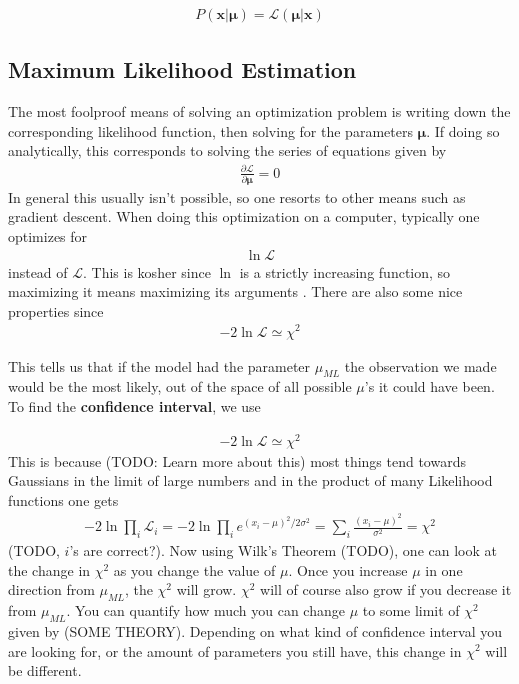 \begin{align}
	P(\textbf{x}|\boldsymbol{\mu}) = \mathcal{L}(\boldsymbol{\mu}|\textbf{x})
\end{align}

\subsection{Maximum Likelihood Estimation}
The most foolproof means of solving an optimization problem is writing down the corresponding likelihood function, then solving for the parameters $\boldsymbol{\mu}$. If doing so analytically, this corresponds to solving the series of equations given by
\begin{align}
\frac{\partial \mathcal{L}}{\partial \boldsymbol{\mu}} = 0
\end{align}
In general this usually isn't possible, so one resorts to other means such as gradient descent. When doing this optimization on a computer, typically one optimizes for
\begin{align}
	\ln\mathcal{L}
\end{align}
instead of $\mathcal{L}$. This is kosher since $\ln$ is a strictly increasing function, so maximizing it means maximizing its arguments \cite{burkov}. There are also some nice properties since 
\begin{align}
-2\ln\mathcal{L} \simeq \chi^2
\end{align}


This tells us that if the model had the parameter $\mu_{ML}$ the observation we made would be the most likely, out of the space of all possible $\mu$'s it could have been. To find the \textbf{confidence interval}, we use

\begin{align}
-2\ln\mathcal{L} \simeq \chi^2
\end{align}
This is because (TODO: Learn more about this) most things tend towards Gaussians in the limit of large numbers and in the product of many Likelihood functions one gets
\begin{align}
	-2\ln\prod_i\mathcal{L}_i = -2\ln\prod_i e^{(x_i-\mu)^2/2\sigma^2} = \sum_i\frac{(x_i-\mu)^2}{\sigma^2} = \chi^2
\end{align}
(TODO, $i$'s are correct?). Now using Wilk's Theorem (TODO), one can look at the change in $\chi^2$ as you change the value of $\mu$. Once you increase $\mu$ in one direction from $\mu_{ML}$, the $\chi^2$ will grow. $\chi^2$ will of course also grow if you decrease it from $\mu_{ML}$. You can quantify how much you can change $\mu$ to some limit of $\chi^2$ given by (SOME THEORY). Depending on what kind of confidence interval you are looking for, or the amount of parameters you still have, this change in $\chi^2$ will be different. 

